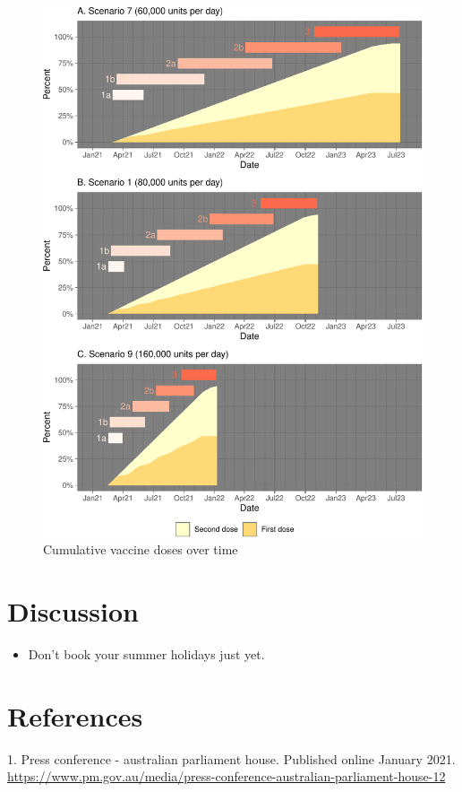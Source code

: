 \documentclass{article}
\begin{document}
\begin{figure}

{\centering \includegraphics{researchNote_files/figure-latex/unnamed-chunk-6-1} 

}

\caption{Cumulative vaccine doses over time}\label{fig:unnamed-chunk-6}
\end{figure}

\hypertarget{discussion}{%
\section{Discussion}\label{discussion}}

\begin{itemize}
\tightlist
\item
  Don't book your summer holidays just yet.
\end{itemize}

\hypertarget{references}{%
\section*{References}\label{references}}

\hypertarget{refs}{}
\leavevmode\hypertarget{ref-pm2021}{}%
1. Press conference - australian parliament house. Published online
January 2021.
\url{https://www.pm.gov.au/media/press-conference-australian-parliament-house-12}



\end{document}
